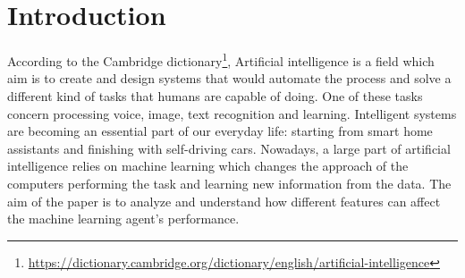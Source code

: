 \documentclass[master]{subfiles}
\begin{document}
\section{Introduction}
According to the Cambridge dictionary\footnote{\url{https://dictionary.cambridge.org/dictionary/english/artificial-intelligence}}, Artificial intelligence is a field which aim is to create and design systems that would automate the process and solve a different kind of tasks that humans are capable of doing. One of these tasks concern processing voice, image, text recognition and learning. Intelligent systems are becoming an essential part of our everyday life: starting from smart home assistants and finishing with self-driving cars. Nowadays, a large part of artificial intelligence relies on machine learning which changes the approach of the computers performing the task and learning new information from the data. The aim of the paper is to analyze and understand how different features can affect the machine learning agent’s performance.
\end{document}

